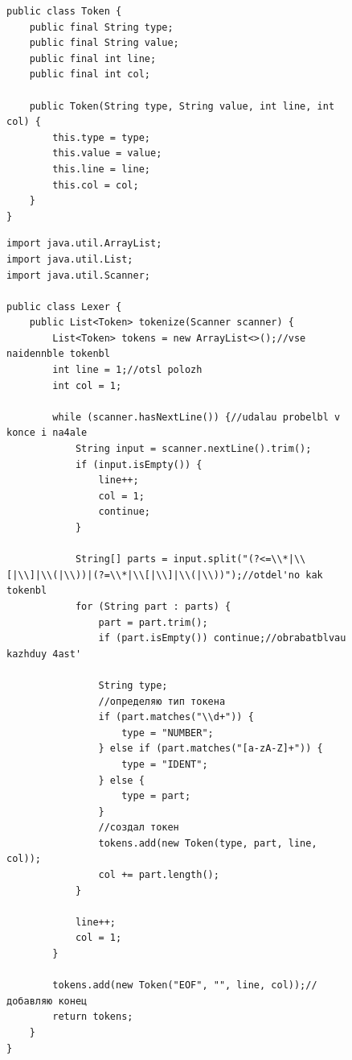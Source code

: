 \documentclass[a4paper, 14pt]{extarticle}
\begin{document}
\begin{figure}[!htb]
\begin{lstlisting}[language={},caption={класс},label={lst:code3}]
public class Token {
    public final String type;
    public final String value;
    public final int line;
    public final int col;

    public Token(String type, String value, int line, int col) {
        this.type = type;
        this.value = value;
        this.line = line;
        this.col = col;
    }
}

\end{lstlisting}
\end{figure}

\begin{figure}[!htb]
\begin{lstlisting}[language={},caption={класс},label={lst:code4}]
import java.util.ArrayList;
import java.util.List;
import java.util.Scanner;

public class Lexer {
    public List<Token> tokenize(Scanner scanner) {
        List<Token> tokens = new ArrayList<>();//vse naidennble tokenbl
        int line = 1;//otsl polozh
        int col = 1;

        while (scanner.hasNextLine()) {//udalau probelbl v konce i na4ale
            String input = scanner.nextLine().trim();
            if (input.isEmpty()) {
                line++;
                col = 1;
                continue;
            }

            String[] parts = input.split("(?<=\\*|\\[|\\]|\\(|\\))|(?=\\*|\\[|\\]|\\(|\\))");//otdel'no kak tokenbl
            for (String part : parts) {
                part = part.trim();
                if (part.isEmpty()) continue;//obrabatblvau kazhduy 4ast'

                String type;
                //определяю тип токена
                if (part.matches("\\d+")) {
                    type = "NUMBER";
                } else if (part.matches("[a-zA-Z]+")) {
                    type = "IDENT";
                } else {
                    type = part;
                }
                //создал токен
                tokens.add(new Token(type, part, line, col));
                col += part.length();
            }

            line++;
            col = 1;
        }

        tokens.add(new Token("EOF", "", line, col));//добавляю конец
        return tokens;
    }
}
\end{lstlisting}
\end{figure}
\end{document}
